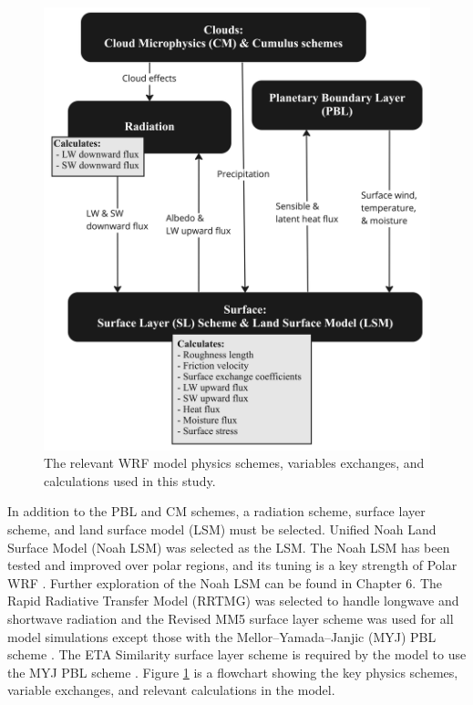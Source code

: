 \begin{figure}[p!]
    \centering 
    \includegraphics[width=1\linewidth]{figures/chapter3/WRF_Flowchart.jpg}
    \caption[WRF Model physics scheme exchanges.]{The relevant WRF model physics schemes, variables exchanges, and calculations used in this study.}
    \label{fig:wrfflow}
\end{figure}

In addition to the PBL and CM schemes, a radiation scheme, surface layer scheme, and land surface model (LSM) must be selected. Unified Noah Land Surface Model (Noah LSM) was selected as the LSM. The Noah LSM has been tested and improved over polar regions, and its tuning is a key strength of Polar WRF \citep{mukul:2004, hines:2015, tewari:2004}. Further exploration of the Noah LSM can be found in Chapter 6. The Rapid Radiative Transfer Model (RRTMG) was selected to handle longwave and shortwave radiation \citep{mlawer:1997} and the Revised MM5 surface layer scheme was used for all model simulations except those with the Mellor–Yamada–Janjic (MYJ) PBL scheme \citep{jimenez:2012}. The ETA Similarity surface layer scheme is required by the model to use the MYJ PBL scheme \citep{janic:2001}. Figure \ref{fig:wrfflow} is a flowchart showing the key physics schemes, variable exchanges, and relevant calculations in the model.

